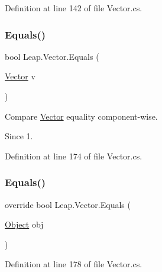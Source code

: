 Definition at line 142 of file Vector.\+cs.

\mbox{\label{struct_leap_1_1_vector_aafba24baa2a58a85c0b07ba28b4a56de}} 
\subsubsection{\texorpdfstring{Equals()}{Equals()}\hspace{0.1cm}{\footnotesize\ttfamily [1/2]}}
{\footnotesize\ttfamily bool Leap.\+Vector.\+Equals (\begin{DoxyParamCaption}\item[{\mbox{\hyperlink{struct_leap_1_1_vector}{Vector}}}]{v }\end{DoxyParamCaption})}



Compare \mbox{\hyperlink{struct_leap_1_1_vector}{Vector}} equality component-\/wise. 

\begin{DoxySince}{Since}
1. 
\end{DoxySince}


Definition at line 174 of file Vector.\+cs.

\mbox{\label{struct_leap_1_1_vector_a024719e566f2af651da6494e0f5cd86c}} 
\subsubsection{\texorpdfstring{Equals()}{Equals()}\hspace{0.1cm}{\footnotesize\ttfamily [2/2]}}
{\footnotesize\ttfamily override bool Leap.\+Vector.\+Equals (\begin{DoxyParamCaption}\item[{\mbox{\hyperlink{_t_m_pro___font_asset_creator_window_8cs_aef19bab18b9814edeef255c43e4f6bbc}{Object}}}]{obj }\end{DoxyParamCaption})}



Definition at line 178 of file Vector.\+cs.

\mbox{\label{struct_leap_1_1_vector_aa95778cb029f0b2b59e7077eb1c3c980}} 

